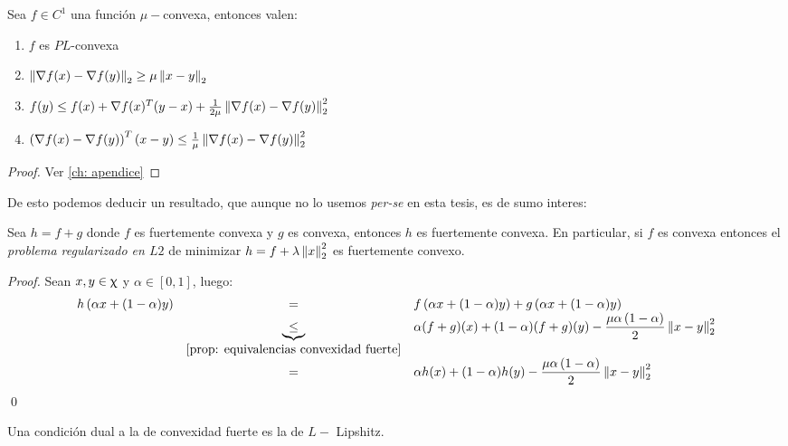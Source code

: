 \begin{proposition}
	\label{prop: implicancias de convexidad fuerte}
	Sea $f \in C^1$ una funci\'on $\mu-$convexa, entonces valen:
	\begin{enumerate}
		\item $f$ es $PL$-convexa
		\item $\left\lVert\nabla f(x) - \nabla f(y)\right\rVert_2 \geq \mu \left\lVert x-y\right\rVert_2$
		\item $f(y) \leq f(x) + \nabla f(x)^T (y-x) + \frac{1}{2 \mu} \left\lVert\nabla f(x) - \nabla f(y)\right\rVert_2^2$
		\item $ \left(\nabla f(x) - \nabla f(y)\right)^T (x-y) \leq \frac{1}{\mu} \left\lVert\nabla f(x) - \nabla f(y)\right\rVert_2^2$
	\end{enumerate}
\end{proposition}

\begin{proof}
	Ver \ref{ch: apendice}
\end{proof}

De esto podemos deducir un resultado, que aunque no lo usemos \textit{per-se} en esta tesis, es de sumo interes:

\begin{corollary}
	Sea $h = f+g$ donde $f$ es fuertemente convexa y $g$ es convexa, entonces $h$ es fuertemente convexa. En particular, si $f$ es convexa entonces el \textit{problema regularizado en $L2$} de minimizar $h = f + \lambda \left\lVert x\right\rVert_2^2$ es fuertemente convexo.
\end{corollary}

\begin{proof}
	Sean $x,y \in \upchi$ y $\alpha \in [0,1]$, luego:
	\begin{equation*}
	\begin{array}{rcl}
	h\left(\alpha x + (1-\alpha)y\right) & = & f\left(\alpha x + (1-\alpha)y\right)  + g\left(\alpha x + (1-\alpha)y\right)  \\
	& \underbrace{\leq}_{\ref{prop: equivalencias convexidad fuerte}} & \alpha(f + g)(x) + (1-\alpha)(f+g)(y) - \dfrac{\mu \alpha \left(1-\alpha\right)}{2} \left\lVert x-y\right\rVert^2_2 \\
	& = & \alpha h(x) + (1-\alpha)h(y) - \dfrac{\mu \alpha \left(1-\alpha\right)}{2} \left\lVert x-y\right\rVert^2_2 
	\end{array}
	\end{equation*}\qed
\end{proof}

Una condici\'on dual a la de convexidad fuerte es la de $L-$ Lipshitz.

